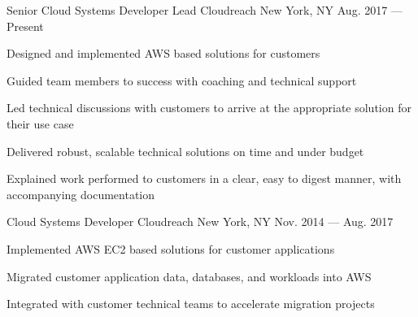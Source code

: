 
\begin{cventries}

\cventry
{Senior Cloud Systems Developer Lead} %
{Cloudreach} %
{New York, NY} %
{Aug. 2017 --- Present} %
{
  \begin{cvitems} %
    \item {Designed and implemented AWS based solutions for customers}
    \item {Guided team members to success with coaching and technical support}
    \item {Led technical discussions with customers to arrive at the appropriate solution for their use case}
    \item {Delivered robust, scalable technical solutions on time and under budget}
    \item {Explained work performed to customers in a clear, easy to digest manner, with accompanying documentation}
  \end{cvitems}
}
  \cventry
    {Cloud Systems Developer} %
    {Cloudreach} %
    {New York, NY} %
    {Nov. 2014 --- Aug. 2017} %
    {
      \begin{cvitems} %
        \item {Implemented AWS EC2 based solutions for customer applications}
        \item {Migrated customer application data, databases, and workloads into AWS}
        \item {Integrated with customer technical teams to accelerate migration projects}
      \end{cvitems}
    }


\end{cventries}
